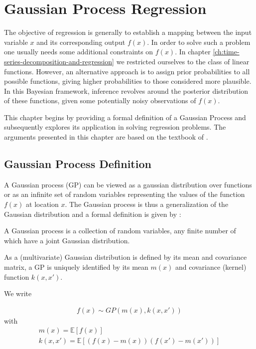 \chapter{Gaussian Process Regression}\label{ch:gaussian-process-regression}
The objective of regression is generally to establish a mapping between the input variable $x$ and
its corresponding output $f(x)$.
In order to solve such a problem one usually needs some additional constraints on $f(x)$.
In chapter \ref{ch:time-series-decomposition-and-regression} we restricted ourselves to the class of linear functions.
However, an alternative approach is to assign prior probabilities to all possible functions,
giving higher probabilities to those considered more plausible. In this Bayesian framework,
inference revolves around the posterior distribution of these functions,
given some potentially noisy observations of $f(x)$.

This chapter begins by providing a formal definition of a Gaussian Process and subsequently explores its application
in solving regression problems.
The arguments presented in this chapter are based on the textbook of \citeauthor{rasmussen_gaussian_2006}.

\section{Gaussian Process Definition}\label{sec:gaussian-process-definition}

A Gaussian process (GP) can be viewed as a gaussian distribution over functions or as an infinite set of random
variables representing the values of the function $f(x)$ at location $x$.
The Gaussian process is thus a generalization of the Gaussian distribution and a formal definition is given
by \citeauthor{rasmussen_gaussian_2006} :

\begin{definition}\label{def:GP}
 A Gaussian process is a collection of random variables, any finite number of which have a joint Gaussian distribution.
\end{definition}


As a (multivariate) Gaussian distribution is defined by its mean and covariance matrix, a GP is
uniquely identified by its mean $m(x)$ and covariance (kernel) function $k(x,x')$.

We write

\begin{gather*}
    f(x) \sim GP(m(x), k(x,x'))
\end{gather*}
with
\begin{gather*}
    m(x) = \mathbb{E}[f(x)] \\
    k(x,x') = \mathbb{E}[(f(x)-m(x))(f(x')-m(x'))]
\end{gather*}

